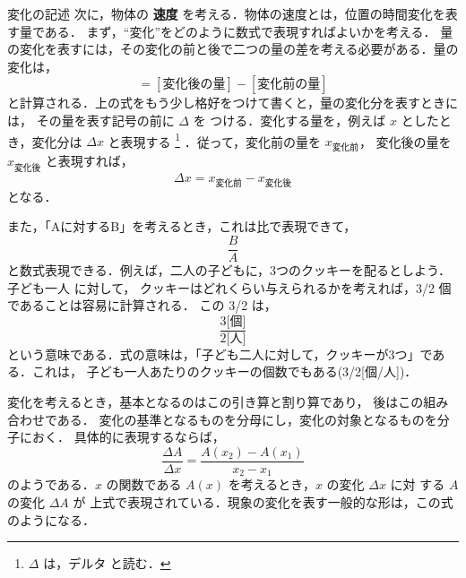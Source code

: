 \begin{memo}{変化の記述}
                次に，物体の \textbf{速度} を考える．物体の速度とは，位置の時間変化を表す量である．
                まず，“変化”をどのように数式で表現すればよいかを考える．
                量の変化を表すには，その変化の前と後で二つの量の差を考える必要がある．量の変化は，
                \begin{equation*}
                [\mbox{量の変化分}] = [\mbox{変化後の量}] - [\mbox{変化前の量}]
                \end{equation*}
                と計算される．上の式をもう少し格好をつけて書くと，量の変化分を表すときには，
                その量を表す記号の前に $\Delta$ を
                つける．変化する量を，例えば $x$ としたとき，変化分は $\Delta x$ と表現する
                \footnote{
                $\Delta$ は，デルタ と読む．
                }
                ．従って，変化前の量を $x_{\mbox{変化前}}$，
                変化後の量を $x_{\mbox{変化後}}$ と表現すれば，
                \begin{equation*}
                \Delta x = x_{\mbox{変化前}} - x_{\mbox{変化後}}
                \end{equation*}
                となる．

                また，「Aに対するB」を考えるとき，これは比で表現できて，
                \begin{equation*}
                \frac{B}{A}
                \end{equation*}
                と数式表現できる．例えば，二人の子どもに，3つのクッキーを配るとしよう．子ども一人
                に対して，
                クッキーはどれくらい与えられるかを考えれば，3/2 個であることは容易に計算される．
                この 3/2 は，
                \begin{equation*}
                    \frac{3[\mbox{個]}}{2[\mbox{人]}}
                \end{equation*}
                という意味である．式の意味は，「子ども二人に対して，クッキーが3つ」である．これは，
                子ども一人あたりのクッキーの個数でもある(3/2[個/人])．

                変化を考えるとき，基本となるのはこの引き算と割り算であり，
                後はこの組み合わせである．
                変化の基準となるものを分母にし，変化の対象となるものを分子におく．
                具体的に表現するならば，
                \begin{equation*}
                    \frac{\Delta A}{\Delta x} = \frac{A(x_{2})-A(x_{1})}{x_{2}-x_{1}}
                \end{equation*}
                のようである．$x$ の関数である $A(x)$ を考えるとき，$x$ の変化 $\Delta x$ に対
                する $A$ の変化 $\Delta A$ が
                上式で表現されている．現象の変化を表す一般的な形は，この式のようになる．



\end{memo}
